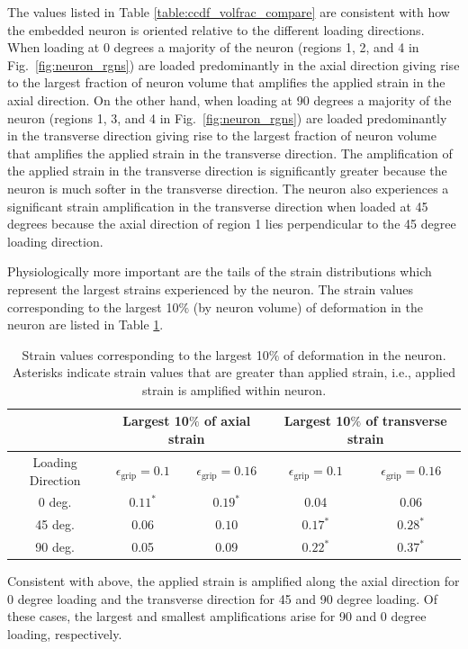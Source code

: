 \documentclass[]{interact}
\begin{document}
The values listed in Table \ref{table:ccdf_volfrac_compare} are consistent with how the embedded neuron is oriented relative to the different loading directions. When loading at 0 degrees a majority of the neuron (regions 1, 2, and 4 in Fig.\ \ref{fig:neuron_rgns}) are loaded predominantly in the axial direction giving rise to the largest fraction of neuron volume that amplifies the applied strain in the axial direction. On the other hand, when loading at 90 degrees a majority of the neuron (regions 1, 3, and 4 in Fig.\ \ref{fig:neuron_rgns}) are loaded predominantly in the transverse direction giving rise to the largest fraction of neuron volume that amplifies the applied strain in the transverse direction. The amplification of the applied strain in the transverse direction is significantly greater because the neuron is much softer in the transverse direction.  The neuron also experiences a significant strain amplification in the transverse direction when loaded at 45 degrees because the axial direction of region 1 lies perpendicular to the 45 degree loading direction.

Physiologically more important are the tails of the strain distributions which represent the largest strains experienced by the neuron. The strain values corresponding to the largest 10$\%$ (by neuron volume) of deformation in the neuron are listed in Table \ref{table:ccdf_tail_strains}. 
%
\begin{table}[ht]
\begin{center}
\begin{tabular}{ c c c c c }
\hline\hline
& \multicolumn{2}{c}{Largest 10$\%$ of axial strain} & \multicolumn{2}{c}{Largest 10$\%$ of transverse strain} \\ \hline 
Loading Direction & $\epsilon_{\text{grip}}=0.1$ & $\epsilon_{\text{grip}}=0.16$ & $\epsilon_{\text{grip}}=0.1$ & $\epsilon_{\text{grip}}=0.16$ \\
\hline 
0 deg. & $0.11^*$ & $0.19^*$ & 0.04 & 0.06\\ 
45 deg. & $0.06$ & $0.10$ & $0.17^*$ & $0.28^*$\\
90 deg. & 0.05 & 0.09 & $0.22^*$ & $0.37^*$\\ \hline \hline
\end{tabular}
\end{center}
\caption{Strain values corresponding to the largest 10$\%$ of deformation in the neuron. Asterisks indicate strain values that are greater than applied strain, i.e., applied strain is amplified within neuron.}
\label{table:ccdf_tail_strains}
\end{table}
%
Consistent with above, the applied strain is amplified along the axial direction for 0 degree loading and the transverse direction for 45 and 90 degree loading. Of these cases, the largest and smallest amplifications arise for 90 and 0 degree loading, respectively.
\end{document}
